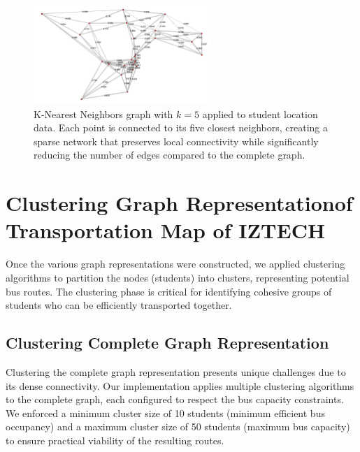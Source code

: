 \begin{figure}[!htbp]
\centering
\includegraphics[width=0.6\textwidth]{img/k_nearest}
\caption{K-Nearest Neighbors graph with $k=5$ applied to student location data. Each point is connected to its five closest neighbors, creating a sparse network that preserves local connectivity while significantly reducing the number of edges compared to the complete graph.}
\label{fig:knn_graph}
\end{figure}

\section{Clustering Graph Representationof Transportation Map of IZTECH}
\label{sec:clustering_graph}

Once the various graph representations were constructed, we applied clustering algorithms to partition the nodes (students) into clusters, representing potential bus routes. The clustering phase is critical for identifying cohesive groups of students who can be efficiently transported together.

\subsection{Clustering Complete Graph Representation}
\label{subsec:clustering_complete}

Clustering the complete graph representation presents unique challenges due to its dense connectivity. Our implementation applies multiple clustering algorithms to the complete graph, each configured to respect the bus capacity constraints. We enforced a minimum cluster size of 10 students (minimum efficient bus occupancy) and a maximum cluster size of 50 students (maximum bus capacity) to ensure practical viability of the resulting routes.

